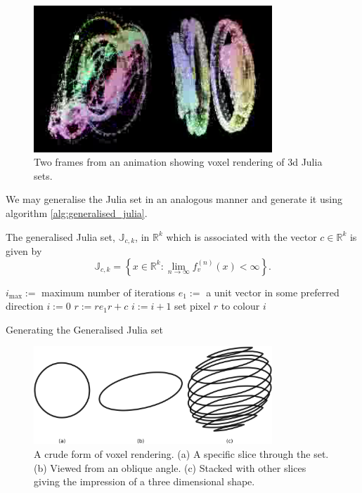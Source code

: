 \begin{figure}
\centering
\includegraphics[width=0.8\textwidth]{3djulia_pair}
\caption{\label{fig:3djulia}
  Two frames from an animation showing voxel
          rendering of 3d Julia sets.}
\end{figure}

We may generalise the Julia set in an analogous manner and generate it
using algorithm \ref{alg:generalised_julia}.

\begin{definition}
The generalised Julia set, $\mathbb{J}_{c,k}$, in $\mathbb{R}^k$
which is associated with the vector $c \in \mathbb{R}^k$ is given by
\[
\mathbb{J}_{c,k} = 
\left\{x \in \mathbb{R}^k
: \lim_{n \rightarrow \infty} f_v^{(n)}(x) < \infty \right\}.
\]
\end{definition}

\begin{fancyalg}
\begin{algorithmic}[1]
\STATE $i_{\mathrm{max}} :=$ maximum number of iterations
\STATE $e_1 :=$ a unit vector in some preferred direction
\STATE $i := 0$
  \STATE $r := re_1r + c$
  \STATE $i := i+1$
\ENDWHILE 
\STATE set pixel $r$ to colour $i$
\ENDFOR
\end{algorithmic}
\caption{
\label{alg:generalised_julia}
  Generating the Generalised Julia set}
\end{fancyalg}

\begin{figure}
\centering
\includegraphics[width=0.8\textwidth]{voxel}
\caption{\label{fig:voxel}
  A crude form of voxel rendering. (a) A specific slice through the set. (b) Viewed from
  an oblique angle. (c) Stacked with other slices giving the impression of a three
  dimensional shape.
}
\end{figure}

